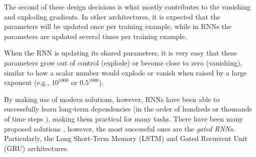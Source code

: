 The second of these design decisions is what mostly
contributes to the vanishing and exploding gradients. In
other architectures, it is expected that the parameters will
be updated once per training example, while in RNNs the
parameters are updated several times per training example.

When the RNN is updating its shared parameters, it is very
easy that these parameters grow out of control (explode) or
become close to zero (vanishing), similar to how a
scalar number would explode or vanish when raised by a large
exponent (e.g., $10^{1000}$ or $0.5^{1000}$).

By making use of modern solutions, however, RNNs have been
able to successfully learn long-term dependencies (in the
order of hundreds or thousands of time steps
\parencite{hochreiter1997long}), making them practical for
many tasks. There have been many proposed solutions
\parencite{elhihi1995hierarchical, yildiz2012revisiting,
jaeger2012long}, however, the most successful ones are the
\emph{gated RNNs}. Particularly, the Long Short-Term Memory (LSTM) and Gated Recurrent Unit (GRU) architectures.
